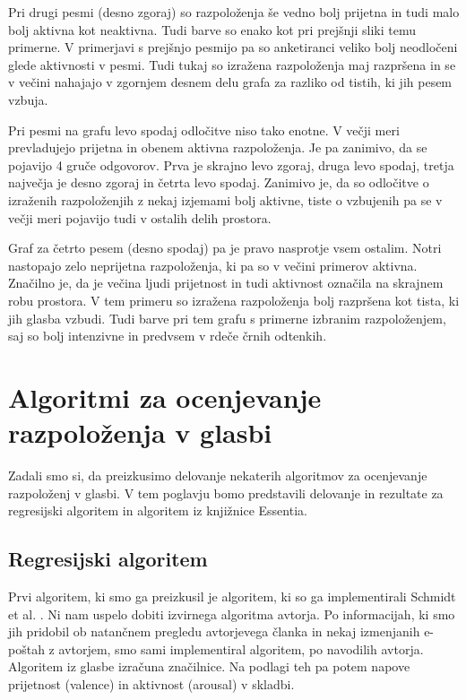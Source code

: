\documentclass[a4paper, 12pt]{book}
\begin{document}
{Pri drugi pesmi (desno zgoraj) so razpoloženja še vedno bolj prijetna in tudi malo bolj aktivna kot neaktivna. Tudi barve so enako kot pri prejšnji sliki temu primerne. V primerjavi s prejšnjo pesmijo pa so anketiranci veliko bolj neodločeni glede aktivnosti v pesmi. Tudi tukaj so izražena razpoloženja maj razpršena in se v večini nahajajo v zgornjem desnem delu grafa za razliko od tistih, ki jih pesem vzbuja. 

Pri pesmi na grafu levo spodaj odločitve niso tako enotne. V večji meri prevladujejo prijetna in obenem aktivna razpoloženja. Je pa zanimivo, da se pojavijo 4 gruče odgovorov. Prva je skrajno levo zgoraj, druga levo spodaj, tretja največja je desno zgoraj in četrta levo spodaj. Zanimivo je, da so odločitve o izraženih razpoloženjih z nekaj izjemami bolj aktivne, tiste o vzbujenih pa se v večji meri pojavijo tudi v ostalih delih prostora. 

Graf za četrto pesem (desno spodaj) pa je pravo nasprotje vsem ostalim. Notri nastopajo zelo neprijetna razpoloženja, ki pa so v večini primerov aktivna. Značilno je, da je večina ljudi prijetnost in tudi aktivnost označila na skrajnem robu prostora. V tem primeru so izražena razpoloženja bolj razpršena kot tista, ki jih glasba vzbudi. Tudi barve pri tem grafu s primerne izbranim razpoloženjem, saj so bolj intenzivne in predvsem v rdeče črnih odtenkih. 

\chapter{Algoritmi za ocenjevanje razpoloženja v glasbi}

Zadali smo si, da preizkusimo delovanje nekaterih algoritmov za ocenjevanje razpoloženj v glasbi. V tem poglavju bomo predstavili delovanje in rezultate za regresijski algoritem in algoritem iz knjižnice Essentia.

\section{Regresijski algoritem}

Prvi algoritem, ki smo ga preizkusil je algoritem, ki so ga implementirali Schmidt et al. \cite{schmidt2009projection}. Ni nam uspelo dobiti izvirnega algoritma avtorja. Po informacijah, ki smo jih pridobil ob natančnem pregledu avtorjevega članka in nekaj izmenjanih e-poštah z avtorjem, smo sami implementiral algoritem, po navodilih avtorja. Algoritem iz glasbe izračuna značilnice. Na podlagi teh pa potem napove prijetnost (valence) in aktivnost (arousal) v skladbi. 

}
\end{document}
